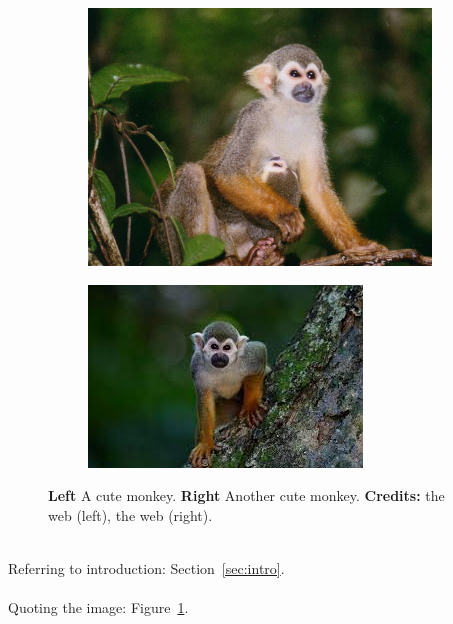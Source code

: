 \documentclass[1-ambra-tesi.tex]{subfiles}
\begin{document}
\begin{figure}[ht]
    \centering
    \begin{subfigure}[l]{0.45\linewidth}
    \includegraphics[width=\linewidth]{images/monkeys.jpeg}
    \caption{}
    \end{subfigure}
    \begin{subfigure}[r]{0.51\linewidth}
    \includegraphics[width=\linewidth]{images/monkeys2.jpeg}
    \caption{}
    \end{subfigure}
    \caption{\textbf{Left} A cute monkey. \textbf{Right} Another cute monkey. \textbf{Credits:} the web (left), the web (right).}
    \label{fig:monkeys}
\end{figure}

\lipsum[4] \\

Referring to introduction: Section~\ref{sec:intro}.\\

\lipsum[5]\\

Quoting the image: Figure~\ref{fig:monkeys}.\\

\lipsum[6]
\end{document}
